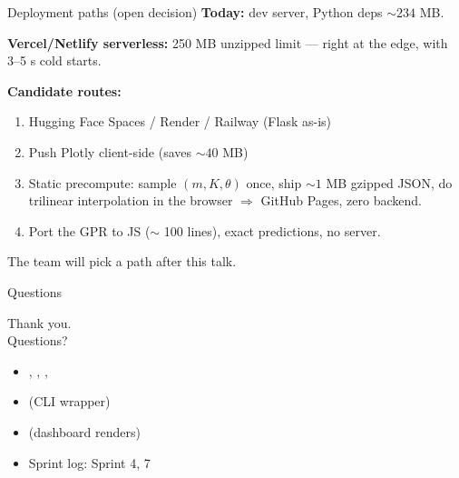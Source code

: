 \begin{frame}{Deployment paths (open decision)}
  \textbf{Today:}  dev server, Python deps \(\sim 234\) MB.

  \vspace{0.3cm}
  \textbf{Vercel/Netlify serverless:} 250 MB unzipped limit ---
  right at the edge, with 3--5 s cold starts.

  \vspace{0.4cm}
  \textbf{Candidate routes:}
  \begin{enumerate}\small
    \item Hugging Face Spaces / Render / Railway (Flask as-is)
    \item Push Plotly client-side (saves \(\sim 40\) MB)
    \item \alert{Static precompute:} sample \((m, K, \theta)\) once,
          ship \(\sim 1\) MB gzipped JSON, do trilinear interpolation in
          the browser \(\Rightarrow\) GitHub Pages, zero backend.
    \item Port the GPR to JS (\(\sim\) 100 lines), exact predictions, no server.
  \end{enumerate}

  \vspace{0.3cm}
  The team will pick a path after this talk.
\end{frame}

\begin{frame}{Questions}
  \vfill
  \begin{center}
    \Large Thank you.\\[0.4cm]
    \normalsize Questions?
  \end{center}
  \vfill
  \scriptsize
  \begin{itemize}
    \item {}, , , 
    \item {} (CLI wrapper)
    \item {} (dashboard renders)
    \item Sprint log:  Sprint 4, 7
  \end{itemize}
\end{frame}


